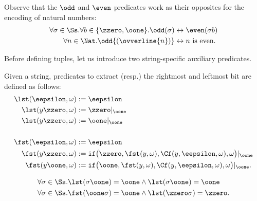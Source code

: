 \begin{remark}
Observe that the $\odd$ and $\even$
predicates work as their opposites
for the encoding of natural numbers:
\begin{align*}
\forall \sigma \in {\Ss}.\forall b
\in \{\zzero,\oone\}. \odd(\sigma) &\leftrightarrow
\even(\sigma b) \\
%
\forall n\in \Nat.\odd{(\ovverline{n})} &\leftrightarrow
n \text{ is even.}
\end{align*}
\end{remark}
%
%
\noindent
Before defining tuples, let us introduce
two string-specific auxiliary predicates.


\begin{defn}
Given a string, predicates to extract (resp.)
the rightmost
and leftmost bit are defined as follows:
\begin{align*}
\lst(\eepsilon,\omega) &:= \eepsilon \\
\lst(y\zzero, \omega) &:= \zzero|_\oone \\
\lst(y\zzero,\omega) &:= \oone|_\oone \\
\\
\fst(\eepsilon,\omega) &:= \eepsilon \\
\fst(y\zzero,\omega) &:=
{\mathtt{if}}\big(\zzero, \fst(y,\omega),
{\Cf}(y,\eepsilon,\omega),\omega\big)|_{\oone} \\
\fst(y\oone,\omega) &:= \mathtt{if}\big(\oone,
\fst(y,\omega), \Cf(y,\eepsilon,\omega),\omega\big)|_{\oone}.
\end{align*}
\end{defn}

\begin{remark}
\begin{align*}
\forall \sigma \in {\Ss}.\lst(\sigma \oone) &=
\oone \wedge \lst(\sigma\oone)=\oone \\
%
\forall \sigma \in {\Ss}.\fst(\oone\sigma) &=
\oone \wedge \lst(\zzero\sigma)=\zzero.
\end{align*}
\end{remark}














































